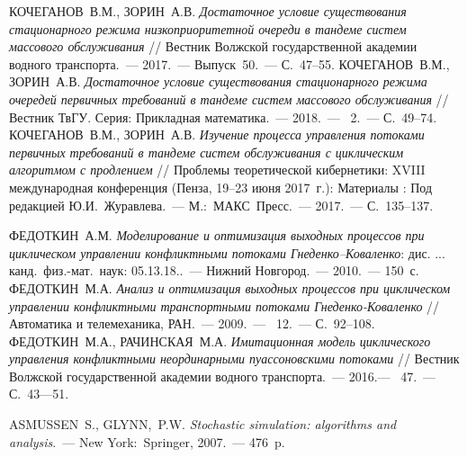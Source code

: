 \documentclass[11pt]{ubs}
\begin{document}
\begin{thebibliography}{100}
 \MakeUppercase{Кочеганов~В.М., Зорин~А.В.} \textit{Достаточное условие существования стационарного режима низкоприоритетной очереди в тандеме систем массового обслуживания} // Вестник Волжской государственной академии водного транспорта.~--- 2017.~--- Выпуск~50.~--- С.~47--55.
 \MakeUppercase{Кочеганов~В.М., Зорин~А.В.} \textit{Достаточное условие существования стационарного режима очередей первичных требований в тандеме систем массового обслуживания} // Вестник ТвГУ. Серия: Прикладная математика.~--- 2018.~--- \No{}~2.~--- С.~49--74.
 \MakeUppercase{Кочеганов~В.М., Зорин~А.В.} \textit{Изучение процесса управления потоками первичных требований в тандеме систем обслуживания с циклическим алгоритмом с продлением} // Проблемы теоретической кибернетики: XVIII международная конференция (Пенза, 19--23 июня 2017~г.): Материалы : Под редакцией Ю.И.~Журавлева.~--- М.:~МАКС~Пресс.~--- 2017.~--- С.~135--137.




 \MakeUppercase{Федоткин~А.М.} \textit{Моделирование и оптимизация выходных процессов при циклическом управлении конфликтными потоками Гнеденко--Коваленко}: дис. ... канд.~физ.-мат.~наук: 05.13.18..~--- Нижний Новгород.~--- 2010.~--- 150~с.
 \MakeUppercase{Федоткин~М.А.} \textit{Анализ и оптимизация выходных процессов при циклическом управлении конфликтными транспортными потоками Гнеденко-Коваленко}  // Автоматика и телемеханика, РАН.~--- 2009.~--- \No{}~12.~--- С.~92--108.
\MakeUppercase{ Федоткин~М.А., Рачинская~М.А.} \textit{Имитационная модель циклического управления конфликтными неординарными пуассоновскими потоками} // Вестник Волжской государственной академии водного транспорта.~--- 2016.--- \No{}~47.~--- С.~43---51.

 \MakeUppercase{Asmussen~S., Glynn,~P.W.} \textit{Stochastic simulation: algorithms and analysis}.~--- New York:~Springer, 2007.~--- 476~p.



\end{thebibliography}
\end{document}
